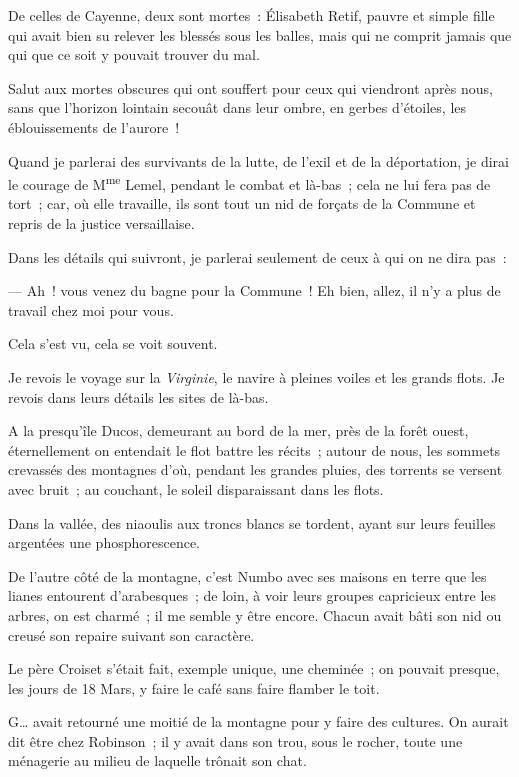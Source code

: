 \documentclass[french,twoside]{book} %
\begin{document}
De celles de Cayenne, deux sont mortes : Élisabeth Retif, pauvre et simple fille qui avait bien su relever les blessés sous les balles, mais qui ne comprit jamais que qui que ce soit y pouvait trouver du mal.\par
Salut aux mortes obscures qui ont souffert pour ceux qui viendront après nous, sans que l’horizon lointain secouât dans leur ombre, en gerbes d’étoiles, les éblouissements de l’aurore !\par
Quand je parlerai des survivants de la lutte, de  l’exil et de la déportation, je dirai le courage de M\textsuperscript{me} Lemel, pendant le combat et là-bas ; cela ne lui fera pas de tort ; car, où elle travaille, ils sont tout un nid de forçats de la Commune et repris de la justice versaillaise.\par
Dans les détails qui suivront, je parlerai seulement de ceux à qui on ne dira pas :\par
— Ah ! vous venez du bagne pour la Commune ! Eh bien, allez, il n’y a plus de travail chez moi pour vous.\par
Cela s’est vu, cela se voit souvent.\par
Je revois le voyage sur la \emph{Virginie}, le navire à pleines voiles et les grands flots. Je revois dans leurs détails les sites de là-bas.\par
A la presqu’île Ducos, demeurant au bord de la mer, près de la forêt ouest, éternellement on entendait le flot battre les récits ; autour de nous, les sommets crevassés des montagnes d’où, pendant les grandes pluies, des torrents se versent avec bruit ; au couchant, le soleil disparaissant dans les flots.\par
Dans la vallée, des niaoulis aux troncs blancs se tordent, ayant sur leurs feuilles argentées une phosphorescence.\par
De l’autre côté de la montagne, c’est Numbo avec ses maisons en terre que les lianes entourent d’arabesques ; de loin, à voir leurs groupes capricieux  entre les arbres, on est charmé ; il me semble y être encore. Chacun avait bâti son nid ou creusé son repaire suivant son caractère.\par
Le père Croiset s’était fait, exemple unique, une cheminée ; on pouvait presque, les jours de 18 Mars, y faire le café sans faire flamber le toit.\par
G… avait retourné une moitié de la montagne pour y faire des cultures. On aurait dit être chez Robinson ; il y avait dans son trou, sous le rocher, toute une ménagerie au milieu de laquelle trônait son chat.\par
\end{document}
